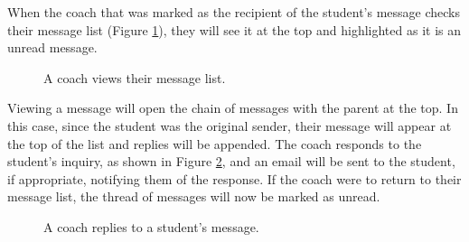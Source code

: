When the coach that was marked as the recipient of the student's message checks their message list (Figure \ref{fig:screens-message-list}), they will see it at the top and highlighted as it is an unread message.

\begin{figure}[h!]
	\centering
	\caption{A coach views their message list.}
	\label{fig:screens-message-list}
\end{figure}

Viewing a message will open the chain of messages with the parent at the top. In this case, since the student was the original sender, their message will appear at the top of the list and replies will be appended. The coach responds to the student's inquiry, as shown in Figure \ref{fig:screens-message-reply}, and an email will be sent to the student, if appropriate, notifying them of the response. If the coach were to return to their message list, the thread of messages will now be marked as unread.

\begin{figure}[h!]
	\centering
	\caption{A coach replies to a student's message.}
	\label{fig:screens-message-reply}
\end{figure}

